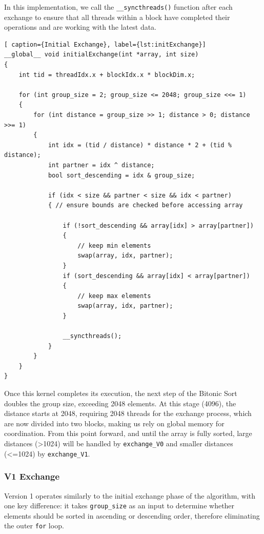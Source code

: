 \documentclass[a4paper,12pt]{article}
\begin{document}
In this implementation, we call the \texttt{\_\_syncthreads()} function after each exchange to ensure that all threads within a block have completed their operations and are working with the latest data.
\\
\begin{lstlisting}[ caption={Initial Exchange}, label={lst:initExchange}]
__global__ void initialExchange(int *array, int size)
{
    int tid = threadIdx.x + blockIdx.x * blockDim.x;

    for (int group_size = 2; group_size <= 2048; group_size <<= 1)
    {
        for (int distance = group_size >> 1; distance > 0; distance >>= 1)
        {
            int idx = (tid / distance) * distance * 2 + (tid % distance);
            int partner = idx ^ distance;
            bool sort_descending = idx & group_size;

            if (idx < size && partner < size && idx < partner)
            { // ensure bounds are checked before accessing array

                if (!sort_descending && array[idx] > array[partner])
                {
                    // keep min elements
                    swap(array, idx, partner);
                }
                if (sort_descending && array[idx] < array[partner])
                {
                    // keep max elements
                    swap(array, idx, partner);
                }

                __syncthreads();
            }
        }
    }
}
\end{lstlisting}

Once this kernel completes its execution, the next step of the Bitonic Sort doubles the group size, exceeding 2048 elements. At this stage (4096), the distance starts at 2048, requiring 2048 threads for the exchange process, which are now divided into two blocks, making us rely on global memory for coordination. From this point forward, and until the array is fully sorted, large distances (>1024) will be handled by \texttt{exchange\_V0} and smaller distances (<=1024) by \texttt{exchange\_V1}.

\subsubsection*{V1 Exchange}

Version 1 operates similarly to the initial exchange phase of the algorithm, with one key difference: it takes \texttt{group\_size} as an input to determine whether elements should be sorted in ascending or descending order, therefore eliminating the outer \texttt{for} loop.  
\end{document}
